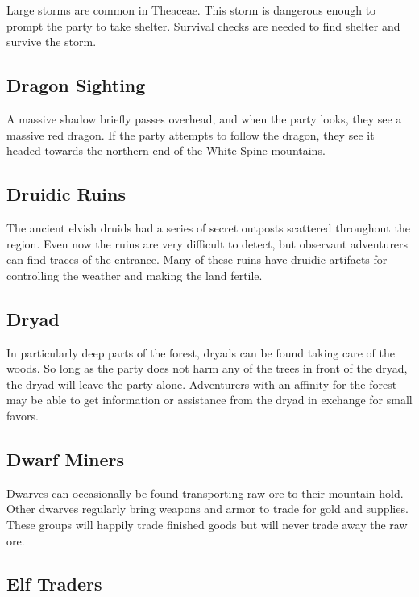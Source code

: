 Large storms are common in Theaceae.
This storm is dangerous enough to prompt the party to take shelter.
Survival checks are needed to find shelter and survive the storm.

\subsection{Dragon Sighting}

A massive shadow briefly passes overhead, and when the party looks, they see a massive red dragon.
If the party attempts to follow the dragon, they see it headed towards the northern end of the White Spine mountains.

\subsection{Druidic Ruins}

The ancient elvish druids had a series of secret outposts scattered throughout the region.
Even now the ruins are very difficult to detect, but observant adventurers can find traces of the entrance.
Many of these ruins have druidic artifacts for controlling the weather and making the land fertile.

\subsection{Dryad}

In particularly deep parts of the forest, dryads can be found taking care of the woods.
So long as the party does not harm any of the trees in front of the dryad, the dryad will leave the party alone.
Adventurers with an affinity for the forest may be able to get information or assistance from the dryad in exchange for small favors.

\subsection{Dwarf Miners}

Dwarves can occasionally be found transporting raw ore to their mountain hold.
Other dwarves regularly bring weapons and armor to trade for gold and supplies.
These groups will happily trade finished goods but will never trade away the raw ore.

\subsection{Elf Traders}


